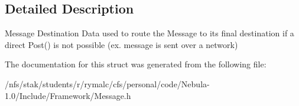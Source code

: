 \subsection{Detailed Description}
Message Destination Data used to route the Message to its final destination if a direct Post() is not possible (ex. message is sent over a network) 

The documentation for this struct was generated from the following file:\begin{DoxyCompactItemize}
\item 
/nfs/stak/students/r/rymalc/cfs/personal/code/Nebula-\/1.0/Include/Framework/Message.h\end{DoxyCompactItemize}
